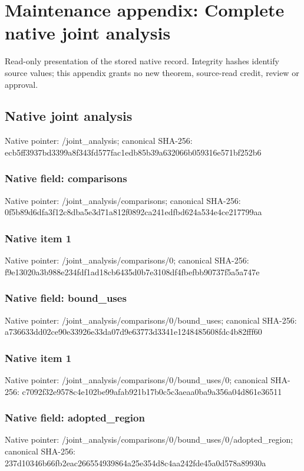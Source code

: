 \documentclass[10pt,a4paper]{article}
\begin{document}
\section{Maintenance appendix: Complete native joint analysis}
Read-only presentation of the stored native record. Integrity hashes identify source values; this appendix grants no new theorem, source-read credit, review or approval.

\subsection{Native joint analysis}
Native pointer: /joint\_\allowbreak{}analysis; canonical SHA-256: ecb5ff3937bd3399a8f343fd577fac1edb85b39a632066b059316e571bf252b6

\subsubsection{Native field: comparisons}
Native pointer: /joint\_\allowbreak{}analysis/comparisons; canonical SHA-256: 0f5b89d6dfa3f12c8dba5e3d71a812f0892ca241edfbd624a534e4ce217799aa

\subsubsection{Native item 1}
Native pointer: /joint\_\allowbreak{}analysis/comparisons/0; canonical SHA-256: f9e13020a3b988e234fdf1ad18cb6435d0b7e3108df4fbefbb90737f5a5a747e

\subsubsection{Native field: bound\_\allowbreak{}uses}
Native pointer: /joint\_\allowbreak{}analysis/comparisons/0/bound\_\allowbreak{}uses; canonical SHA-256: a736633dd02ce90e33926e33da07d9e63773d3341e1248485608fdc4b82fff60

\subsubsection{Native item 1}
Native pointer: /joint\_\allowbreak{}analysis/comparisons/0/bound\_\allowbreak{}uses/0; canonical SHA-256: c7092f32e9578c4e102be99afab921b17b0c5c3aeaa0ba9a356a04d861e36511

\subsubsection{Native field: adopted\_\allowbreak{}region}
Native pointer: /joint\_\allowbreak{}analysis/comparisons/0/bound\_\allowbreak{}uses/0/adopted\_\allowbreak{}region; canonical SHA-256: 237d10346b66fb2eac266554939864a25e354d8c4aa242fde45a0d578a89930a
\end{document}
